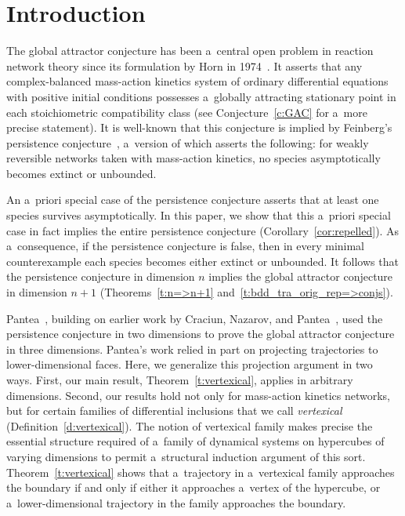 \documentclass[pdftex]{sigma}
\begin{document}


\section{Introduction}
\label{sec:intro}

The global attractor conjecture has been a~central open problem in reaction network theory since its formulation by
Horn in 1974~\cite{horn74dynamics}.
It asserts that any complex-balanced mass-action kinetics system of ordinary dif\/ferential equations with positive
initial conditions possesses a~globally attracting stationary point in each stoichiometric compatibility class (see
Conjecture~\ref{c:GAC} for a~more precise statement).
It is well-known that this conjecture is implied by Feinberg's persistence conjecture~\cite[Remark~6.1.E]{Fein87},
a~version of which asserts the following: for weakly reversible networks taken with mass-action kinetics, no species
asymptotically becomes extinct or unbounded.

An a~priori special case of the persistence conjecture asserts that at least one species survives asymptotically.
In this paper, we show that this a~priori special case in fact implies the entire persistence conjecture
(Corollary~\ref{cor:repelled}).
As a~consequence, if the persistence conjecture is false, then in every minimal counterexample each species becomes
either extinct or unbounded.
It follows that the persistence conjecture in dimension $n$ implies the global attractor conjecture in dimension $n+1$
(Theorems~\ref{t:n=>n+1} and~\ref{t:bdd_tra_orig_rep=>conjs}).

Pantea~\cite{Pantea}, building on earlier work by Craciun, Nazarov, and Pantea~\cite{CNP}, used the persistence
conjecture in two dimensions to prove the global attractor conjecture in three dimensions.
Pantea's work relied in part on projecting trajectories to lower-dimensional faces.
Here, we generalize this projection argument in two ways.
First, our main result, Theorem~\ref{t:vertexical}, applies in arbitrary dimensions.
Second, our results hold not only for mass-action kinetics networks, but for certain families of dif\/ferential
inclusions that we call \emph{vertexical} (Def\/inition~\ref{d:vertexical}).
The notion of vertexical family makes precise the essential structure required of a~family of dynamical systems on
hypercubes of varying dimensions to permit a~structural induction argument of this sort.
Theorem~\ref{t:vertexical} shows that a~trajectory in a~vertexical family approaches the boundary if and only if either
it approaches a~vertex of the hypercube, or a~lower-dimensional trajectory in the family approaches the boundary.
\end{document}
